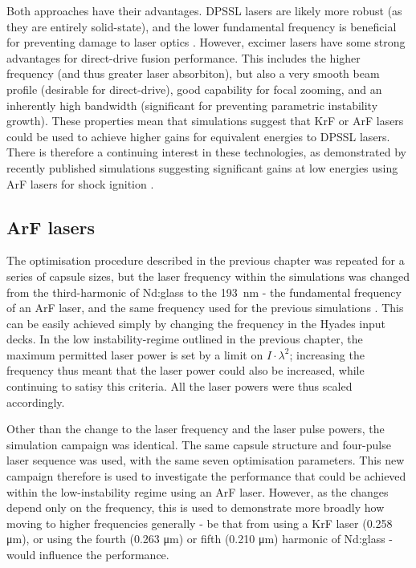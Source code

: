 Both approaches have their advantages. DPSSL lasers are likely more robust (as they are entirely solid-state), and the lower fundamental frequency is beneficial for preventing damage to laser optics \cite{Sethian2010}. However, excimer lasers have some strong advantages for direct-drive fusion performance. This includes the higher frequency (and thus greater laser absorbiton), but also a very smooth beam profile (desirable for direct-drive), good capability for focal zooming, and an inherently high bandwidth (significant for preventing parametric instability growth). These properties mean that simulations suggest that KrF or ArF lasers could be used
to achieve higher gains for equivalent energies to DPSSL lasers. There is therefore a continuing interest in these technologies, as demonstrated by recently published simulations suggesting significant gains at low energies using ArF lasers for shock ignition \cite{Obenschain2020}.

\subsection{ArF lasers}

The optimisation procedure described in the previous chapter was repeated for a series of capsule sizes, but the laser frequency within the simulations was changed from the third-harmonic of Nd:glass to the 193~nm - the fundamental frequency of an ArF laser, and the same frequency used for the previous simulations \cite{Obenschain2020}. This can be easily achieved simply by changing the frequency in the Hyades input decks. In the low instability-regime outlined in the previous chapter, the maximum permitted laser power is set by a limit on $I \cdot \lambda^2$; increasing the frequency thus meant that the laser power could also be increased, while continuing to satisy this criteria. All the laser powers were thus scaled accordingly. 

Other than the change to the laser frequency and the laser pulse powers, the simulation campaign was identical. The same capsule structure and four-pulse laser sequence was used, with the same seven optimisation parameters. This new campaign therefore is used to investigate the performance that could be achieved within the low-instability regime using an ArF laser. However, as the changes depend only on the frequency, this is used to demonstrate more broadly how moving to higher frequencies generally - be that from using a KrF laser (0.258 \unit{\micro\meter}), or using the fourth (0.263 \unit{\micro\meter}) or fifth (0.210 \unit{\micro\meter}) harmonic of Nd:glass - would influence the performance.

